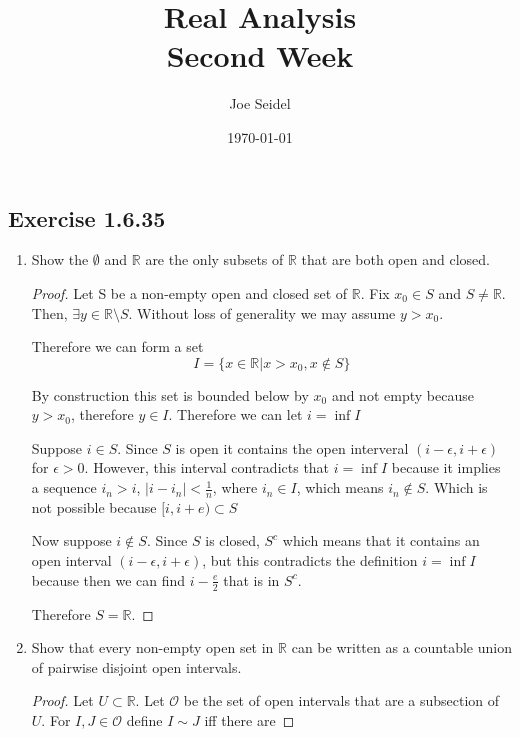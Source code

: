 \documentclass{tufte-book}
\title{Real Analysis\\Second Week }
\author{Joe Seidel}
\date{\today}
\theoremstyle{mytheoremstyle}
\theoremstyle{mylemstyle}
\theoremstyle{mydefstyle}
\begin{document}
\maketitle
{}
\newpage
{}

\subsection{Exercise 1.6.35}

\begin{enumerate}
\item Show the $\emptyset$ and $\mathbb{R}$ are the only subsets of $\mathbb{R}$ that are both open and closed.

\begin{proof}
Let S be a non-empty open and closed set of $\mathbb{R}$.  Fix $x_0 \in S$ and $S \neq \mathbb{R}$.  Then, $\exists y \in \mathbb{R} \setminus S$.  Without loss of generality we may assume $y > x_0$.

Therefore we can form a set
\[I = \{ x \in \mathbb{R} | x > x_0, x \notin S\}\]

By construction this set is bounded below by $x_0$ and not empty because $y > x_0$, therefore $y \in I$.  Therefore we can let $i = \inf I$

Suppose $i \in S$.  Since $S$ is open it contains the open interveral $(i-\epsilon, i+\epsilon)$ for $\epsilon > 0$.  However, this interval contradicts that $i = \inf I$ because it implies a sequence $i_n > i$, $|i - i_n| < \frac{1}{n}$, where $i_n \in I$, which means $i_n \notin S$.  Which is not possible because $[i, i+e) \subset S$

Now suppose $i \notin S$.  Since $S$ is closed, $S^c$ which means that it contains an open interval $(i-\epsilon, i+\epsilon)$, but this contradicts the definition $i = \inf I$ because then we can find $i - \frac{e}{2}$ that is in $S^c$.

Therefore $S = \mathbb{R}$.
\end{proof}

\item Show that every non-empty open set in $\mathbb{R}$ can be written as a countable union of pairwise disjoint open intervals.

\begin{proof}

Let $U \subset \mathbb{R}$.  Let $\mathcal{O}$ be the set of open intervals that are a subsection of $U$.  For $I,J \in \mathcal{O}$ define $I \sim J$ iff there are


\end{proof}
\end{enumerate}
\end{document}
